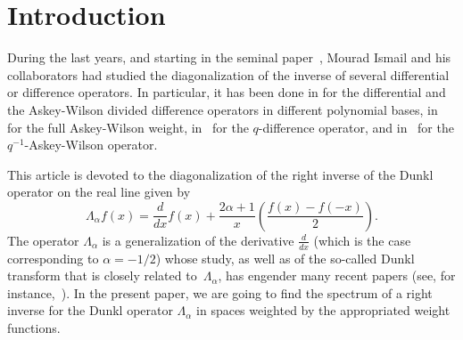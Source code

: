 \documentclass[12pt,a4paper]{amsart}
\theoremstyle{plain}
\theoremstyle{definition}
\begin{document}

\section{Introduction}

During the last years, and starting in the seminal paper~\cite{IZ}, 
Mourad Ismail and his collaborators had studied the diagonalization 
of the inverse of several differential or difference operators. 
In particular, it has been done in \cite{IZ, IRZ} for the differential 
and the Askey-Wilson divided difference operators in different polynomial 
bases, in~\cite{IR} for the full Askey-Wilson weight,
in~\cite{ISem} for the $q$-difference operator, and in~\cite{IJacob} 
for the $q^{-1}$-Askey-Wilson operator.

This article is devoted to the diagonalization of the right inverse of 
the Dunkl operator on the real line given by
\[
  \Lambda_\alpha f(x) = \frac{d}{dx}f(x) + \frac{2\alpha+1}{x}
  \left(\frac{f(x)-f(-x)}{2}\right).
\]
The operator $\Lambda_\alpha$ is a generalization of the derivative 
$\frac{d}{dx}$ (which is the case corresponding to $\alpha=-1/2$) 
whose study, as well as of the so-called Dunkl transform that is 
closely related to~$\Lambda_\alpha$, has engender many recent papers 
(see, for instance,~\cite{AJ, BCV, CV, Dunkl, Dunkl2, Jeu, Rosenblum, Rosler}). 
In the present paper, we are going to find the spectrum of a right inverse 
for the Dunkl operator $\Lambda_\alpha$ in spaces weighted by the appropriated 
weight functions.
\end{document}
